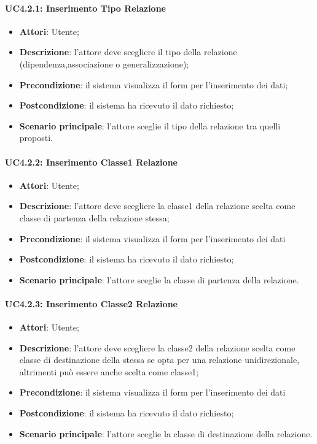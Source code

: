 \begin{itemize}
\begin{itemize}
\begin{itemize}
\begin{itemize}
\paragraph{UC4.2.1: Inserimento Tipo Relazione}
\label{UC4.2.1}
\begin{itemize}
	\item \textbf{Attori}: Utente;
	\item \textbf{Descrizione}: l'attore deve scegliere il tipo della relazione (dipendenza,associazione o generalizzazione);
	\item \textbf{Precondizione}: il sistema visualizza il form per l'inserimento dei dati;
	\item \textbf{Postcondizione}: il sistema ha ricevuto il dato richiesto;
	\item \textbf{Scenario principale}: l'attore sceglie il tipo della relazione tra quelli proposti.
\end{itemize}

\paragraph{UC4.2.2: Inserimento Classe1 Relazione}
\label{UC4.2.2}
\begin{itemize}
	\item \textbf{Attori}: Utente;
	\item \textbf{Descrizione}: l'attore deve scegliere la classe1 della relazione scelta come classe di partenza della relazione stessa;
	\item \textbf{Precondizione}: il sistema visualizza il form per l'inserimento dei dati
	\item \textbf{Postcondizione}: il sistema ha ricevuto il dato richiesto;
	\item \textbf{Scenario principale}: l'attore sceglie la classe di partenza della relazione.
\end{itemize}

\paragraph{UC4.2.3: Inserimento Classe2 Relazione}
\label{UC4.2.3}
\begin{itemize}
	\item \textbf{Attori}: Utente;
	\item \textbf{Descrizione}: l'attore deve scegliere la classe2 della relazione scelta come classe di destinazione della stessa se opta per una relazione unidirezionale, altrimenti può essere anche scelta come classe1;
	\item \textbf{Precondizione}: il sistema visualizza il form per l'inserimento dei dati
	\item \textbf{Postcondizione}: il sistema ha ricevuto il dato richiesto;
	\item \textbf{Scenario principale}: l'attore sceglie la classe di destinazione della relazione.
\end{itemize}


\end{itemize}
\end{itemize}
\end{itemize}
\end{itemize}
